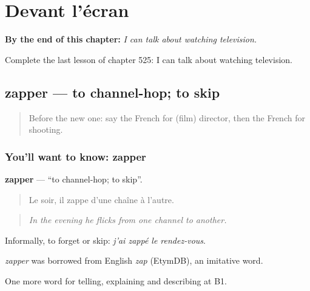 
\chapter{Devant l'écran}
\label{ch:fr-devant-l-ecran}

\begin{chapteropening}
\textbf{By the end of this chapter:} \emph{I can talk about watching television.}

Complete the last lesson of chapter 525: I can talk about watching television.
\end{chapteropening}

\section[zapper]{zapper — to channel-hop; to skip}

\label{lesson:FR-C525-zapper}



\begin{quote}
Before the new one: say the French for (film) director, then the French for shooting.
\end{quote}

\subsection*{You'll want to know: zapper}
\textbf{zapper} — \textquotedblleft{}to channel-hop; to skip\textquotedblright{}.

\begin{quote}
Le soir, il zappe d'une chaîne à l'autre.
\end{quote}

\begin{quote}
\emph{In the evening he flicks from one channel to another.}
\end{quote}

Informally, to forget or skip: \emph{j'ai zappé le rendez-vous}.

\begin{cousinweb}
\emph{zapper} was borrowed from English \emph{zap} (EtymDB), an imitative word.
\end{cousinweb}

\begin{grammarlens}[title={What you've built}]
One more word for telling, explaining and describing at B1.
\end{grammarlens}

